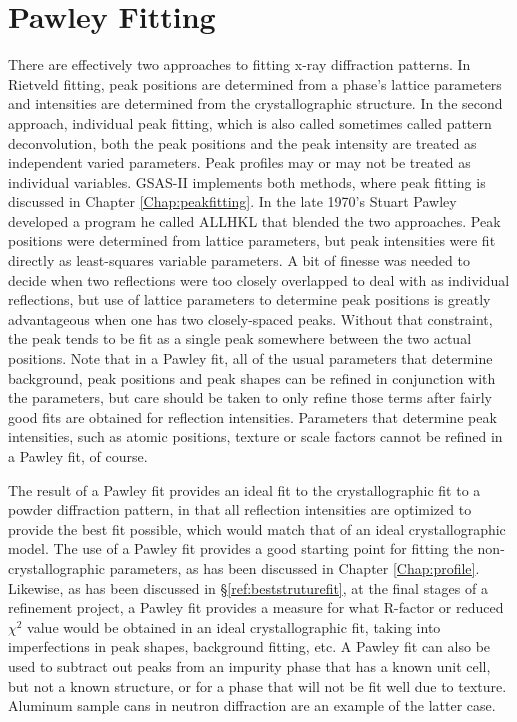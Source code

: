 \section{Pawley Fitting}\label{ref:Pawley}
There are effectively two approaches to fitting x-ray diffraction patterns. In Rietveld fitting, peak positions are determined from a phase's lattice parameters and intensities are determined from the crystallographic structure. In the second approach, individual peak fitting, which is also called sometimes called pattern deconvolution, both the peak positions and the peak intensity are treated as independent varied parameters. Peak profiles may or may not be treated as individual variables. GSAS-II implements both methods, where peak fitting is discussed in Chapter \ref{Chap:peakfitting}. In the late 1970's Stuart Pawley developed a program he called ALLHKL that blended the two approaches. Peak positions were determined from lattice parameters, but peak intensities were fit directly as least-squares variable parameters. A bit of finesse was needed to decide when two reflections were too closely overlapped to deal with as individual reflections, but use of lattice parameters to determine peak positions is greatly advantageous when one has two closely-spaced peaks. Without that constraint, the peak tends to be fit as a single peak somewhere between the two actual positions. Note that in a Pawley fit, all of the usual parameters that determine background, peak positions and peak shapes can be refined in conjunction with the parameters, but care should be taken to only refine those terms after fairly good fits are obtained for reflection intensities. Parameters that determine peak intensities, such as atomic positions, texture or scale factors cannot be refined in a Pawley fit, of course.

The result of a Pawley fit provides an ideal fit to the crystallographic fit to a powder diffraction pattern, in that all reflection intensities are optimized to provide the best fit possible, which would match that of an ideal crystallographic model. The use of a Pawley fit provides a good starting point for fitting the non-crystallographic parameters, as has been discussed in Chapter \ref{Chap:profile}. Likewise, as has been discussed in \S\ref{ref:beststruturefit}, at the final stages of a refinement project, a Pawley fit provides a measure for what R-factor or reduced $\chi^2$ value would be obtained in an ideal crystallographic fit, taking into imperfections in peak shapes, background fitting, etc. A Pawley fit can also be used to subtract out peaks from an impurity phase that has a known unit cell, but not a known structure, or for a phase that will not be fit well due to texture. Aluminum sample cans in neutron diffraction are an example of the latter case. 

